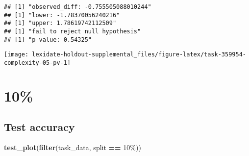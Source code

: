 \documentclass[
]{book}
\newenvironment{Shaded}{\begin{snugshade}}{\end{snugshade}}
\newcommand{\AttributeTok}[1]{\textcolor[rgb]{0.13,0.29,0.53}{#1}}
\newcommand{\DecValTok}[1]{\textcolor[rgb]{0.00,0.00,0.81}{#1}}
\newcommand{\FunctionTok}[1]{\textcolor[rgb]{0.13,0.29,0.53}{\textbf{#1}}}
\newcommand{\NormalTok}[1]{#1}
\newcommand{\OtherTok}[1]{\textcolor[rgb]{0.56,0.35,0.01}{#1}}
\newcommand{\SpecialCharTok}[1]{\textcolor[rgb]{0.81,0.36,0.00}{\textbf{#1}}}
\newcommand{\StringTok}[1]{\textcolor[rgb]{0.31,0.60,0.02}{#1}}
\begin{document}
\begin{Shaded}
\end{Shaded}

\begin{verbatim}
## [1] "observed_diff: -0.755505088010244"
## [1] "lower: -1.78370056240216"
## [1] "upper: 1.78619742112509"
## [1] "fail to reject null hypothesis"
## [1] "p-value: 0.54325"
\end{verbatim}

\texttt{[image: lexidate-holdout-supplemental\_files/figure-latex/task-359954-complexity-05-pv-1]}

\hypertarget{section-6}{%
\section{10\%}\label{section-6}}

\hypertarget{test-accuracy-6}{%
\subsection{Test accuracy}\label{test-accuracy-6}}

\begin{Shaded}
\begin{Highlighting}[]
\FunctionTok{test\_plot}\NormalTok{(}\FunctionTok{filter}\NormalTok{(task\_data, split }\SpecialCharTok{==} \StringTok{\textquotesingle{}10\%\textquotesingle{}}\NormalTok{))}
\end{Highlighting}
\end{Shaded}
\end{document}
